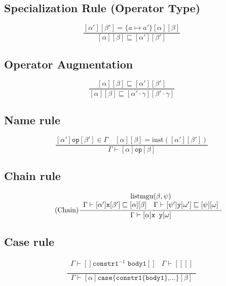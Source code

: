 \documentclass{article}
\newcommand{\op}[3]{[#1] \texttt{#2} [#3]}
\begin{document}
\subsection*{Specialization Rule (Operator Type)}
\begin{equation*}
  \tag{Op spec}
  \frac{
    \op{\alpha'}{}{\beta'} = \{ a \mapsto a' \} \op{\alpha}{}{\beta}
  }{
    \op{\alpha}{}{\beta} \sqsubseteq \op{\alpha'}{}{\beta'}
  }
\end{equation*}

\subsection*{Operator Augmentation}
\begin{equation*}
  \tag{Op aug}
  \frac{
    \op{\alpha}{}{\beta} \sqsubseteq \op{\alpha'}{}{\beta'}
  }{
    \op{\alpha}{}{\beta} \sqsubseteq \op{\alpha' \cdot \gamma}{}{\beta' \cdot \gamma}
  }
\end{equation*}

\subsection*{Name rule}
\begin{equation*}
  \tag{Name}
  \frac{
    \op{\alpha'}{op}{\beta'} \in \Gamma \quad
    \op{\alpha}{}{\beta} = \text{inst}(\op{\alpha'}{}{\beta'})
  }{
    \Gamma \vdash \op{\alpha}{op}{\beta}
  }
\end{equation*}

\subsection*{Chain rule}
\begin{equation*}
  \tag{Chain}
  \frac{
    \begin{array}{ll}
      \multicolumn{2}{c}{\text{listmgu}(\beta, \psi)} \\
      \Gamma \vdash \op{\alpha'}{x}{\beta'} \sqsubseteq \op{\alpha}{}{\beta} &
      \Gamma \vdash \op{\psi'}{y}{\omega'} \sqsubseteq \op{\psi}{}{\omega} \\
    \end{array}
  }{
    \Gamma \vdash \op{\alpha}{x y}{\omega}
  }
\end{equation*}

\subsection*{Case rule}
\begin{equation*}
  \tag{Chain}
  \frac{
    \begin{array}{ll}
      \Gamma \vdash \op{}{constr1$^{-1}$ body1}{} &
      \Gamma \vdash \op{}{}{} \\
    \end{array}
  }{
    \Gamma \vdash \op{\alpha}{case\{constr1\{body1\},...\}}{\beta}
  }
\end{equation*}
\end{document}

